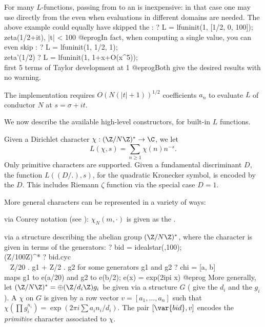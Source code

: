 For many $L$-functions, passing from  to an  is
inexpensive: in that case one may use  directly from the
 even when evaluations in different domains are needed. The
above example could equally have skipped the :
\bprog
? L = lfuninit(1, [1/2, 0, 100]); \\ zeta(1/2+it), |t| < 100
@eprog\noindent In fact, when computing a single value, you can even skip
:
\bprog
? L = lfuninit(1, 1/2, 1); \\ zeta'(1/2)
? L = lfuninit(1, 1+x+O(x^5)); \\ first 5 terms of Taylor development at 1
@eprog\noindent Both give the desired results with no warning.

The implementation requires $O(N(|t|+1))^{1/2}$ coefficients $a_n$
to evaluate $L$ of conductor $N$ at $s = \sigma + i t$.

We now describe the available high-level constructors, for built-in $L$
functions.


Given a Dirichlet character $\chi:(\Z/N\Z)^*\to \C$, we let
$$L(\chi, s) = \sum_{n\geq 1} \chi(n) n^{-s}.$$
Only primitive characters are supported. Given a fundamental discriminant
$D$, the function $L((D/.), s)$, for the quadratic Kronecker symbol, is encoded
by the  $D$. This includes Riemann $\zeta$ function via the special
case $D = 1$.

More general characters can be represented in a variety of ways:

\item via Conrey notation (see ): $\chi_N(m,\cdot)$
is given as the  .

\item via a  structure describing the abelian  group $(\Z/N\Z)^*$,
where the character is given in terms of the  generators:
\bprog
  ? bid = idealstar(,100); \\ (Z/100Z)^*
  ? bid.cyc \\ ~ Z/20 . g1  + Z/2 . g2 for some generators g1 and g2
  ? chi = [a, b]  \\ maps g1 to e(a/20) and g2 to e(b/2);  e(x) = exp(2ipi x)
@eprog\noindent
More generally, let $(\Z/N\Z)^* = \oplus (\Z/d_i\Z) g_i$ be given via a
 structure $G$ ( give the $d_i$ and  the
$g_i$). A  $\chi$ on $G$ is given by a row vector
$v = [a_1,\ldots,a_n]$ such that $\chi(\prod g_i^{n_i}) = \exp(2\pi i\sum a_i
n_i / d_i)$. The pair $[\var{bid}, v]$ encodes the \emph{primitive} character
associated to $\chi$.

